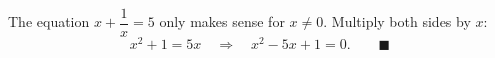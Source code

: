 The equation $x+\dfrac{1}{x}=5$ only makes sense for $x\ne0$. Multiply both sides by $x$:
\[
x^2+1=5x\quad\Longrightarrow\quad x^2-5x+1=0. \qquad\blacksquare
\]
